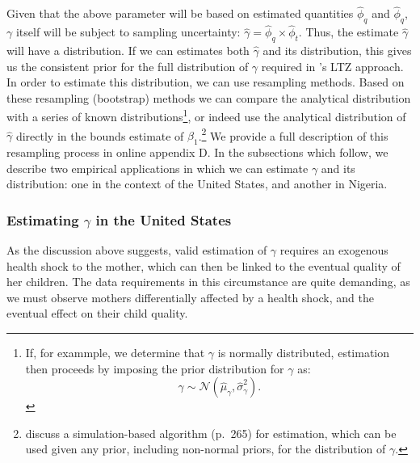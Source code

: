 \documentclass[subeqn]{article}
\begin{document}
\begin{spacing}{1.4}
Given that the above parameter will be based on estimated quantities $\hat\phi_q$
and $\hat\phi_q$, $\gamma$ itself will be subject to sampling uncertainty:
$\hat\gamma = \hat\phi_q\times \hat\phi_t$.  Thus, the estimate $\hat\gamma$ will
have a distribution.  If we can estimates both $\hat\gamma$ and its distribution,
this gives us the consistent prior for the full distribution of $\gamma$ required
in \citeauthor{Conleyetal2012}'s LTZ approach.  In order to estimate this
distribution, we can use resampling methods.  Based on these resampling (bootstrap)
methods we can compare the analytical distribution with a series of known
distributions\footnote{If, for exammple, we determine that $\gamma$ is normally
  distributed, estimation then proceeds by imposing the prior distribution for
  $\gamma$ as:
  \begin{equation}
    \label{TWINeqn:ltz}
    \gamma \sim \mathcal{N}(\hat\mu_\gamma,\hat\sigma^2_\gamma).
  \end{equation}
}, or indeed use the analytical distribution of $\hat\gamma$ directly in the
bounds estimate of $\beta_1$.\footnote{\citet{Conleyetal2012} discuss a
  simulation-based algorithm (p.\ 265) for estimation, which can be used given
  any prior, including non-normal priors, for the distribution of $\gamma$.}
We provide a full description of this resampling process in online appendix
D. In the subsections which follow, we describe two
empirical applications in which we can estimate $\gamma$ and its distribution:
one in the context of the United States, and another in Nigeria.

\subsubsection{Estimating $\gamma$ in the United States}
\label{sscn:USgamma}
As the discussion above suggests, valid estimation of $\gamma$ requires an
exogenous health shock to the mother, which can then be linked to the eventual
quality of her children.  The data requirements in this circumstance are quite
demanding, as we must observe mothers differentially affected by a health shock,
and the eventual effect on their child quality.


\end{spacing}
\end{document}
